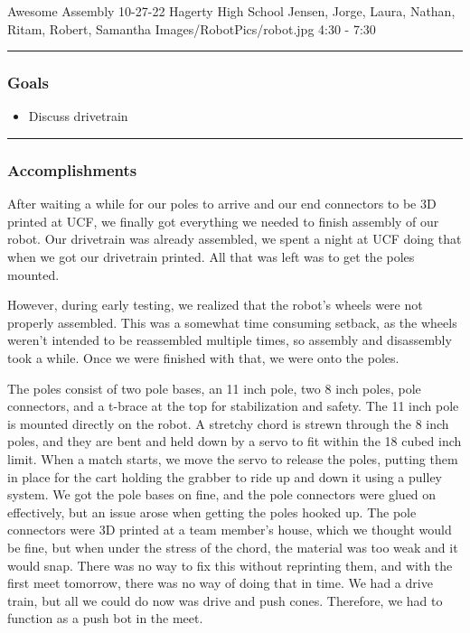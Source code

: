 \insertmeeting 
	{Awesome Assembly} 
	{10-27-22}
	{Hagerty High School}
	{Jensen, Jorge, Laura, Nathan, Ritam, Robert, Samantha}
	{Images/RobotPics/robot.jpg}
	{4:30 - 7:30}
	
\noindent\hfil\rule{\textwidth}{.4pt}\hfil
\subsubsection*{Goals}
\begin{itemize}
    \item Discuss drivetrain

\end{itemize} 

\noindent\hfil\rule{\textwidth}{.4pt}\hfil

\subsubsection*{Accomplishments}
After waiting a while for our poles to arrive and our end connectors to be 3D printed at UCF, we finally got everything we needed to finish assembly of our robot. Our drivetrain was already assembled, we spent a night at UCF doing that when we got our drivetrain printed. All that was left was to get the poles mounted.

However, during early testing, we realized that the robot's wheels were not properly assembled. This was a somewhat time consuming setback, as the wheels weren't intended to be reassembled multiple times, so assembly and disassembly took a while. Once we were finished with that, we were onto the poles.

The poles consist of two pole bases, an 11 inch pole, two 8 inch poles, pole connectors, and a t-brace at the top for stabilization and safety. The 11 inch pole is mounted directly on the robot. A stretchy chord is strewn through the 8 inch poles, and they are bent and held down by a servo to fit within the 18 cubed inch limit. When a match starts, we move the servo to release the poles, putting them in place for the cart holding the grabber to ride up and down it using a pulley system.
We got the pole bases on fine, and the pole connectors were glued on effectively, but an issue arose when getting the poles hooked up. The pole connectors were 3D printed at a team member's house, which we thought would be fine, but when under the stress of the chord, the material was too weak and it would snap. There was no way to fix this without reprinting them, and with the first meet tomorrow, there was no way of doing that in time. We had a drive train, but all we could do now was drive and push cones. Therefore, we had to function as a push bot in the meet.


